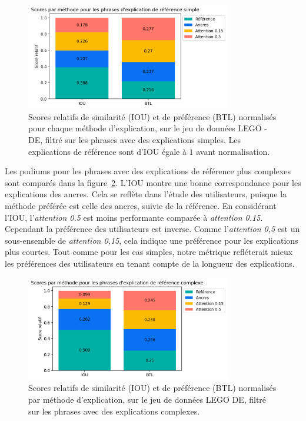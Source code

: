 \begin{figure}[h!tpb]
  \setlength{\belowcaptionskip}{-20pt}
 \begin{center}
  \includegraphics[width=0.8\textwidth]{S3-Comparaison_de_methodes/figures/iou_btl_s.png}
  \caption{Scores relatifs de similarité (IOU) et de préférence (BTL) normalisés pour chaque méthode d'explication, sur le jeu de données LEGO - DE, filtré sur les phrases avec des explications simples. Les explications de référence sont d'IOU égale à $1$ avant normalisation.  }\label{fig:iou_btl_s}
 \end{center}
\end{figure}

Les podiums pour les phrases avec des explications de référence plus complexes sont comparés dans la figure~\ref{fig:iou_btl_c}. L’IOU montre une bonne correspondance pour les explications des ancres. Cela se reflète dans l'étude des utilisateurs, puisque la méthode préférée est celle des ancres, suivie de la référence. En considérant l’IOU, l'\textit{attention 0.5} est moins performante comparée à \textit{attention 0.15}. Cependant la préférence des utilisateurs est inverse. Comme l'\textit{attention 0,5} est un sous-ensemble de \textit{attention 0,15}, cela indique une préférence pour les explications plus courtes. Tout comme pour les cas simples, notre métrique refléterait mieux les préférences des utilisateurs en tenant compte de la longueur des explications.

\begin{figure}[h!tpb]
 \begin{center}
  \includegraphics[width=0.8\textwidth]{S3-Comparaison_de_methodes/figures/iou_btl_c.png}
  \caption{Scores relatifs de similarité (IOU) et de préférence (BTL) normalisés par méthode d'explication, sur le jeu de données LEGO DE, filtré sur les phrases avec des explications complexes. }\label{fig:iou_btl_c}
 \end{center}
\end{figure}


